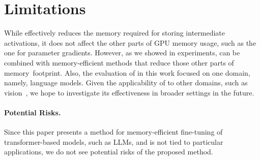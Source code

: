 \section{Limitations}
\label{sec:limitations}


While \method effectively reduces the memory required for storing intermediate activations,
it does not affect the other parts of GPU memory usage, such as the one for parameter gradients.
However, as we showed in experiments, \method can be combined with memory-efficient methods that reduce those other parts of memory~footprint.
Also, the evaluation of \method in this work focused on one domain, namely, language models.
Given the applicability of \method to other domains, such as vision~\citep{DBLP:conf/iclr/DosovitskiyB0WZ21},
we hope to investigate its effectiveness in broader settings in the future.



\paragraph{Potential Risks.}
Since this paper presents a method for memory-efficient fine-tuning of transformer-based models, such as LLMs, and is not tied to particular applications,
we do not see potential risks of the proposed method.
%
